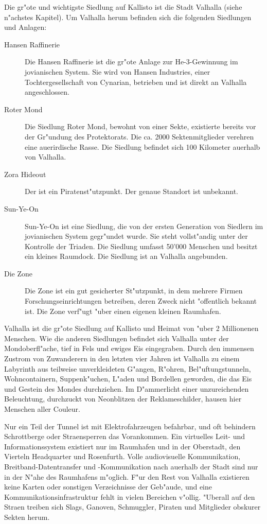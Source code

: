 Die gr"o\3te und wichtigste Siedlung auf Kallisto ist die Stadt Valhalla (siehe n"achstes Kapitel). Um Valhalla herum befinden sich die folgenden Siedlungen und Anlagen:

\begin{description}
    \item[Hansen Raffinerie] Die Hansen Raffinerie ist die gr"o\3te Anlage zur He-3-Gewinnung im jovianischen System. Sie wird von Hansen 
        Industries, einer Tochtergesellschaft von Cynarian, betrieben und ist direkt an Valhalla angeschlossen.
    \item[Roter Mond] Die Siedlung Roter Mond, bewohnt von einer Sekte, existierte bereits vor der Gr"undung des Protektorats. Die ca. 2000 
        Sektenmitglieder verehren eine au\3erirdische Rasse. Die Siedlung befindet sich 100 Kilometer au\3erhalb von Valhalla.
    \item[Zora Hideout] Der ist ein Piratenst"utzpunkt. Der genaue Standort ist unbekannt.
    \item[Sun-Ye-On] Sun-Ye-On ist eine Siedlung, die von der ersten Generation von Siedlern im jovianischen System gegr"undet wurde. Sie 
        steht vollst"andig unter der Kontrolle der Triaden. Die Siedlung umfasst 50'000 Menschen und besitzt ein kleines Raumdock. Die Siedlung ist an Valhalla angebunden.
    \item[Die Zone] Die Zone ist ein gut gesicherter St"utzpunkt, in dem mehrere Firmen Forschungseinrichtungen betreiben, deren Zweck nicht 
        "offentlich bekannt ist. Die Zone verf"ugt "uber einen eigenen kleinen Raumhafen.
\end{description}


Valhalla ist die gr"o\3te Siedlung auf Kallisto und Heimat von "uber 2 Millionenen Menschen. Wie die anderen Siedlungen befindet sich Valhalla unter der Mondoberfl"ache, tief in Fels und ewiges Eis eingegraben. Durch den immensen Zustrom von Zuwanderern in den letzten vier Jahren ist Valhalla zu einem Labyrinth aus teilweise unverkleideten G"angen, R"ohren, Bel"uftungstunneln, Wohncontainern, Suppenk"uchen, L"aden und Bordellen geworden, die das Eis und Gestein des Mondes durchziehen. Im D"ammerlicht einer unzureichenden Beleuchtung, durchzuckt von Neonblitzen der Reklameschilder, hausen hier Menschen aller Couleur.

Nur ein Teil der Tunnel ist mit Elektrofahrzeugen befahrbar, und oft behindern Schrottberge oder Stra\3ensperren das Vorankommen. Ein virtuelles Leit- und Informationssystem existiert nur im Raumhafen und in der Oberstadt, den Vierteln Headquarter und Rosenfurth. Volle audiovisuelle Kommunikation, Breitband-Datentransfer und -Kommunikation nach au\3erhalb der Stadt sind nur in der N"ahe des Raumhafens m"oglich. F"ur den Rest von Valhalla existieren keine Karten oder sonstigen Verzeichnisse der Geb"aude, und eine Kommunikationsinfrastruktur fehlt in vielen Bereichen v"ollig. "Uberall auf den Stra\3en treiben sich Slags, Ganoven, Schmuggler, Piraten und Mitglieder obskurer Sekten herum.

